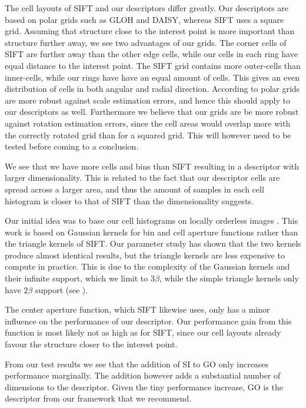 \documentclass[thesis.tex]{subfiles}
\begin{document}
The cell layouts of SIFT and our descriptors differ greatly. Our descriptors are based on polar grids such as GLOH and DAISY, whereas SIFT uses a square grid. Assuming that structure close to the interest point is more important than structure further away, we see two advantages of our grids. The corner cells of SIFT are further away than the other edge cells, while our cells in each ring have equal distance to the interest point. The SIFT grid contains more outer-cells than inner-cells, while our rings have have an equal amount of cells. This gives an even distribution of cells in both angular and radial direction. According to \citet{cui2009scale} polar grids are more robust against scale estimation errors, and hence this should apply to our descriptors as well. Furthermore we believe that our grids are be more robust against rotation estimation errors, since the cell areas would overlap more with the correctly rotated grid than for a squared grid. This will however need to be tested before coming to a conclusion.

We see that we have more cells and bins than SIFT resulting in a descriptor with larger dimensionality. This is related to the fact that our descriptor cells are spread across a larger area, and thus the amount of samples in each cell histogram  is closer to that of SIFT than the dimensionality suggests.

Our initial idea was to base our cell histograms on locally orderless images \cite{koenderink1999structure}. This work is based on Gaussian kernels for bin and cell aperture functions rather than the triangle kernels of SIFT. Our parameter study has shown that the two kernels produce almost identical results, but the triangle kernels are less expensive to compute in practice. This is due to the complexity of the Gaussian kernels and their infinite support, which we limit to 3$\beta$, while the simple triangle kernels only have $2\beta$ support (see ).

The center aperture function, which SIFT likewise uses, only has a minor influence on the performance of our descriptor. Our performance gain from this function is most likely not as high as for SIFT, since our cell layouts already favour the structure closer to the interest point.

From our test results we see that the addition of SI to GO only increases performance marginally. The addition however adds a substantial number of dimensions to the descriptor.
Given the tiny performance increase, GO is the descriptor from our framework that we recommend.
\end{document}
